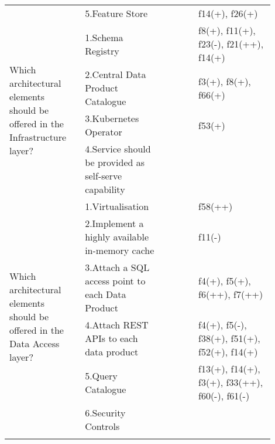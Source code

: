 \begin{tabular}{|p{0.12\linewidth}|p{0.015\linewidth}|p{0.3\linewidth}|p{0.15\linewidth}|p{0.31\linewidth}|}
 & \multirow{-5}{\linewidth}{ \cellcolor{emerald_shape_6}{34}} &5.Feature Store&\cellcolor{emerald_shape_3}{s9, s20, s27, s40} & f14(+), f26(+)\\
\multirow{4}{\linewidth}{Which architectural elements should be offered in the Infrastructure layer?} &\cellcolor{emerald_shape_6}{} &1.Schema Registry&\cellcolor{emerald_shape_5}{s3, s6, s7, s15, s16, s17, s19, s20, s24, s41, s47, s48, s54, s57} & f8(+), f11(+), f23(-), f21(++), f14(+)\\
 & \cellcolor{emerald_shape_6}{} & 2.Central Data Product Catalogue&\cellcolor{emerald_shape_6}{s5, s9, s15, s20, s23, s31, s32, s39, s40, s42, s45, s46, s47, s48, s49, s53, s54, s55} & f3(+), f8(+), f66(+)\\
 & \cellcolor{emerald_shape_6}{} & 3.Kubernetes Operator&\cellcolor{emerald_shape_4}{s6, s14, s32, s35, s39, s43, s45, s47} & f53(+)\\
 & \multirow{-4}{\linewidth}{ \cellcolor{emerald_shape_6}{30}} &4.Service should be provided as self-serve capability&\cellcolor{emerald_shape_1}{} & \\
\multirow{6}{\linewidth}{Which architectural elements should be offered in the Data Access layer?} &\cellcolor{emerald_shape_6}{} &1.Virtualisation&\cellcolor{emerald_shape_4}{s4, s14, s15, s18, s19, s20, s46, s49} & f58(++)\\
 & \cellcolor{emerald_shape_6}{} & 2.Implement a highly available in-memory cache&\cellcolor{emerald_shape_3}{s5, s14, s15, s18} & f11(-)\\
 & \cellcolor{emerald_shape_6}{} & 3.Attach a SQL access point to each Data Product&\cellcolor{emerald_shape_6}{s2, s3, s5, s7, s10, s13, s14, s15, s16, s27, s30, s31, s32, s36, s37, s38, s39, s43, s46, s48, s49} & f4(+), f5(+), f6(++), f7(++)\\
 & \cellcolor{emerald_shape_6}{} & 4.Attach REST APIs to each data product&\cellcolor{emerald_shape_6}{s2, s3, s5, s6, s7, s8, s9, s15, s17, s18, s20, s30, s32, s33, s34, s36, s37, s38, s39, s40, s41, s45, s49, s52} & f4(+), f5(-), f38(+), f51(+), f52(+), f14(+)\\
 & \cellcolor{emerald_shape_6}{} & 5.Query Catalogue&\cellcolor{emerald_shape_3}{s1, s3, s9, s14, s30, s32, s43} & f13(+), f14(+), f3(+), f33(++), f60(-), f61(-)\\
 & \multirow{-6}{\linewidth}{ \cellcolor{emerald_shape_6}{36}} &6.Security Controls&\cellcolor{emerald_shape_1}{} & \\
\hline
\multicolumn{5}{l}{\parbox{\textwidth}{\smallskip
}}
\end{tabular}

